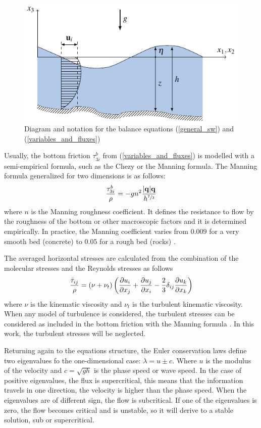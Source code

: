 \begin{figure}
    \centering
    \includegraphics[width=.8\textwidth]{img/diagram.pdf}
    \caption{Diagram and notation for the balance equations (\ref{general_sw}) and (\ref{variables_and_fluxes})}
    \label{diagram}
\end{figure}



Usually, the bottom friction $\tau^b_{3i}$ from (\ref{variables_and_fluxes}) is modelled with a semi-empirical formula, such as the Chezy or the Manning formula. The Manning formula generalized for two dimensions is as follows:
\begin{equation}
\frac{\tau^b_{3i}}{\rho} = -gn^2\frac{\lvert\mathbf{q}\rvert\mathbf{q}}{h^{\sfrac{7}{3}}}
\end{equation}
where $n$ is the Manning roughness coefficient. It defines the resistance to flow by the roughness of the bottom or other macroscopic factors and it is determined empirically. In practice, the Manning coefficient varies from $0.009$ for a very smooth bed (concrete) to $0.05$ for a rough bed (rocks) \cite{chow1988}.


The averaged horizontal stresses are calculated from the combination of the molecular stresses and the Reynolds stresses as follows
\begin{equation} \label{stresses}
\frac{\bar{\tau}_{ij}}{\rho} = (\nu + \nu_t)\left(
    \frac{\partial u_i}{\partial x_j} + \frac{\partial u_j}{\partial x_i} -\frac{2}{3}\delta_{ij}\frac{\partial u_k}{\partial x_k} \right)
\end{equation}
where $\nu$ is the kinematic viscosity and $\nu_t$ is the turbulent kinematic viscosity. When any model of turbulence is considered, the turbulent stresses can be considered as included in the bottom friction with the Manning formula \cite{blade2005}. In this work, the turbulent stresses will be neglected.



Returning again to the equations structure, the Euler conservation laws define two eigenvalues fo the one-dimensional case: $\lambda = u \pm c$. Where $u$ is the modulus of the velocity and $c=\sqrt{gh}$ is the phase speed or wave speed.
In the case of positive eigenvalues, the flux is supercritical, this means that the information travels in one direction, the velocity is higher than the phase speed. When the eigenvalues are of different sign, the flow is subcritical. If one of the eigenvalues is zero, the flow becomes critical and is unstable, so it will derive to a stable solution, sub or supercritical.


